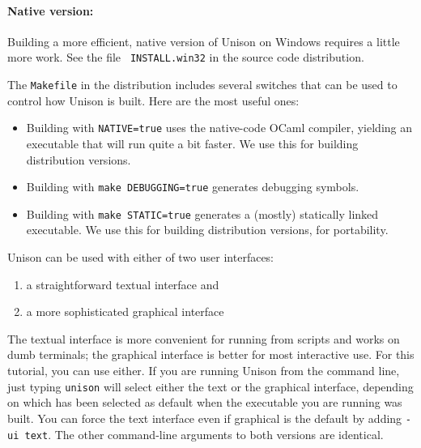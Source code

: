 \documentclass{article}
\begin{document}
\paragraph{Native version:} Building a more efficient, native version of
Unison on Windows requires a little more work.  See the file {\tt
  INSTALL.win32} in the source code distribution.



The \verb|Makefile| in the distribution includes several switches that
can be used to control how Unison is built.  Here are the most useful
ones:
\begin{itemize}
\item Building with \verb|NATIVE=true| uses the native-code OCaml
compiler, yielding an executable that will run quite a bit faster. We use
this for building distribution versions.
\item Building with \verb|make DEBUGGING=true| generates debugging
symbols. 
\item Building with \verb|make STATIC=true| generates a (mostly)
statically linked executable.  We use this for building distribution
versions, for portability.
\end{itemize}





Unison can be used with either of two user interfaces: 
\begin{enumerate}
\item a straightforward textual interface and 
\item a more sophisticated graphical interface
\end{enumerate}
The textual interface is more convenient for running from scripts and
works on dumb terminals; the graphical interface is better for most
interactive use.  For this tutorial, you can use either.  If you are running
Unison from the command line, just typing {\tt unison} 
will select either the text or the graphical interface, depending on which
has been selected as default when the executable you are running was
built.  You can force the text interface even if graphical is the default by
adding {\tt -ui text}.  
The other command-line arguments to both versions are identical.  
\end{document}

